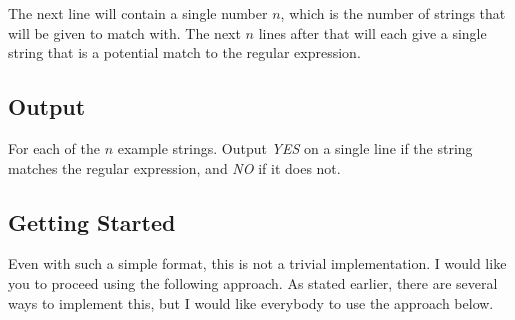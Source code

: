 \documentclass[11pt]{article}
\begin{document}
The next line will contain a single number $n$, which is the number of strings that will be given to match with. The next $n$ lines after that will each give a single string that is a potential match to the regular expression.

\subsection*{Output}

For each of the $n$ example strings. Output \emph{YES} on a single line if the string matches the regular expression, and \emph{NO} if it does not.

\subsection*{Getting Started}

Even with such a simple format, this is not a trivial implementation. I would like you to proceed using the following approach. As stated earlier, there are several ways to implement this, but I would like everybody to use the approach below.
\end{document}
